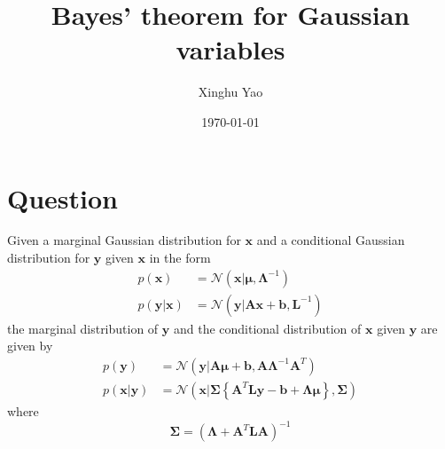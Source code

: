 \documentclass{article}
\title{Bayes' theorem for Gaussian variables}
\author{Xinghu Yao}
\date{\today}
\begin{document}
	\maketitle
	\section{Question}
    Given a marginal Gaussian distribution for $\mathbf{x}$ and a conditional Gaussian distribution for $\mathbf{y}$ given $\mathbf{x}$ in the form
    \begin{align}
    p\left(\mathbf{x}\right) &= \mathcal{N}\left(\mathbf{x}|\boldsymbol{\mu},\boldsymbol{\Lambda}^{-1}\right)\\
    p\left(\mathbf{y}|\mathbf{x}\right)&=\mathcal{N}\left(\mathbf{y}|\mathbf{Ax}+\mathbf{b},\mathbf{L}^{-1}\right)
    \end{align}
    the marginal distribution of $\mathbf{y}$ and the conditional distribution of $\mathbf{x}$ given $\mathbf{y}$ are given by
    \begin{align}
    p\left(\mathbf{y}\right)&=\mathcal{N}\left(\mathbf{y}|\mathbf{A}\boldsymbol{\mu}+\mathbf{b},\mathbf{A}\boldsymbol{\Lambda}^{-1}\mathbf{A}^T\right)\\
    p\left(\mathbf{x}|\mathbf{y}\right)&=\mathcal{N}\left(\mathbf{x}|\boldsymbol{\Sigma}\left\{\mathbf{A}^T\mathbf{L}\mathbf{y-b}+\boldsymbol{\Lambda\mu}\right\},\boldsymbol{\Sigma}\right)
    \end{align}
    where
    \begin{equation}
    \boldsymbol{\Sigma} = \left(\boldsymbol{\Lambda}+\mathbf{A}^T\mathbf{LA}\right)^{-1}
    \end{equation}
\end{document}

